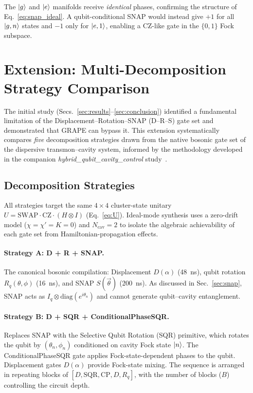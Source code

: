 \documentclass[aps,pra,twocolumn,reprint,floatfix,amsmath,amssymb]{revtex4-2}
\begin{document}
The $\ket{g}$ and $\ket{e}$ manifolds receive \emph{identical}
phases, confirming the structure of Eq.~\eqref{eq:snap_ideal}.
A qubit-conditional SNAP would instead give $+1$ for all
$\ket{g,n}$ states and $-1$ only for $\ket{e,1}$, enabling a
$\mathrm{CZ}$-like gate in the $\{0,1\}$ Fock subspace.

\section{Extension: Multi-Decomposition Strategy Comparison}
\label{sec:ext_decomp}

The initial study (Secs.~\ref{sec:results}--\ref{sec:conclusion})
identified a fundamental limitation of the Displacement--Rotation--SNAP
(D--R--S) gate set and demonstrated that GRAPE can bypass it.
This extension systematically compares \emph{five} decomposition
strategies drawn from the native bosonic gate set of the dispersive
transmon--cavity system, informed by the methodology developed
in the companion \textit{hybrid\_qubit\_cavity\_control}
study~\cite{cqed_sim}.

\subsection{Decomposition Strategies}

All strategies target the same $4\times4$ cluster-state unitary
$U=\mathrm{SWAP}\cdot\mathrm{CZ}\cdot(H\otimes I)$
(Eq.~\ref{eq:U}).  Ideal-mode synthesis uses a zero-drift model
($\chi=\chi'=K=0$) and $N_\mathrm{cav}=2$ to isolate the algebraic
achievability of each gate set from Hamiltonian-propagation effects.

\paragraph{Strategy A: D + R + SNAP.}
The canonical bosonic compilation: Displacement $D(\alpha)$
(\SI{48}{ns}), qubit rotation $R_q(\theta,\phi)$ (\SI{16}{ns}),
and SNAP $S(\vec\theta)$ (\SI{200}{ns}).
As discussed in Sec.~\ref{sec:snap}, SNAP acts as
$I_q\otimes\mathrm{diag}(e^{i\theta_n})$ and cannot generate
qubit--cavity entanglement.

\paragraph{Strategy B: D + SQR + ConditionalPhaseSQR.}
Replaces SNAP with the Selective Qubit Rotation (SQR) primitive,
which rotates the qubit by $(\theta_n,\phi_n)$ conditioned on
cavity Fock state $\ket{n}$.  The ConditionalPhaseSQR gate applies
Fock-state-dependent phases to the qubit.  Displacement gates
$D(\alpha)$ provide Fock-state mixing.  The sequence is arranged in
repeating blocks of $[D, \mathrm{SQR}, \mathrm{CP}, D, R_q]$, with
the number of blocks ($B$) controlling the circuit depth.
\end{document}
